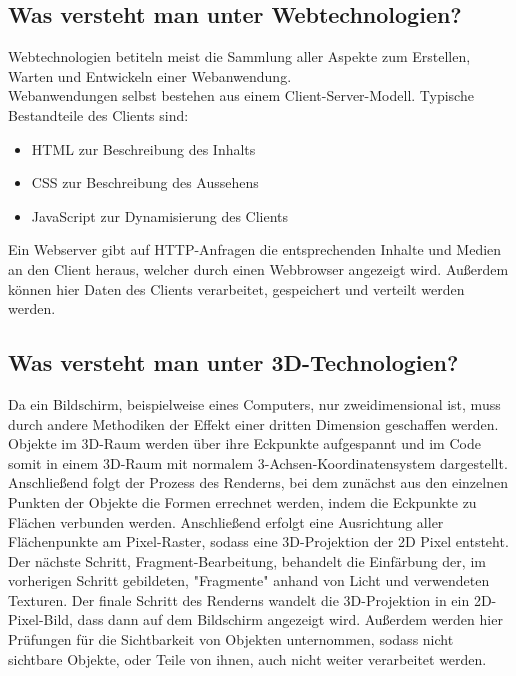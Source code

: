 \subsection{Was versteht man unter Webtechnologien?}
Webtechnologien betiteln meist die Sammlung aller Aspekte zum Erstellen, Warten und Entwickeln einer Webanwendung.\\
Webanwendungen selbst bestehen aus einem Client-Server-Modell.
Typische Bestandteile des Clients sind: 
\begin{itemize}
	\item HTML zur Beschreibung des Inhalts
	\item CSS zur Beschreibung des Aussehens
	\item JavaScript zur Dynamisierung des Clients
\end{itemize}
Ein Webserver gibt auf HTTP-Anfragen die entsprechenden Inhalte und Medien an den Client heraus, welcher durch einen Webbrowser angezeigt wird. Außerdem können hier Daten des Clients verarbeitet, gespeichert und verteilt werden werden.
\subsection{Was versteht man unter 3D-Technologien?}
Da ein Bildschirm, beispielweise eines Computers, nur zweidimensional ist, muss durch andere Methodiken der Effekt einer dritten Dimension geschaffen werden.\\Objekte im 3D-Raum werden über ihre Eckpunkte aufgespannt und im Code somit in einem 3D-Raum mit normalem 3-Achsen-Koordinatensystem dargestellt. Anschließend folgt der Prozess des Renderns, bei dem zunächst aus den einzelnen Punkten der Objekte die Formen errechnet werden, indem die Eckpunkte zu Flächen verbunden werden. Anschließend erfolgt eine Ausrichtung aller Flächenpunkte am Pixel-Raster, sodass eine 3D-Projektion der 2D Pixel entsteht. Der nächste Schritt, Fragment-Bearbeitung, behandelt die Einfärbung der, im vorherigen Schritt gebildeten, "Fragmente" anhand von Licht und verwendeten Texturen. Der finale Schritt des Renderns wandelt die 3D-Projektion in ein 2D-Pixel-Bild, dass dann auf dem Bildschirm angezeigt wird. Außerdem werden hier Prüfungen für die Sichtbarkeit von Objekten unternommen, sodass nicht sichtbare Objekte, oder Teile von ihnen, auch nicht weiter verarbeitet werden.

